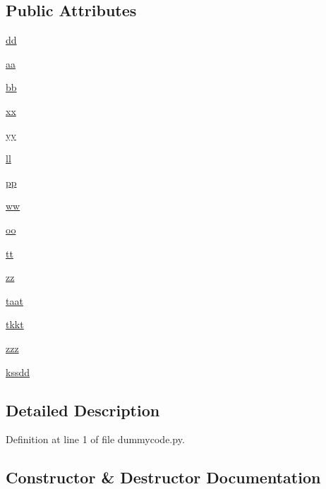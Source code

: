 \subsection*{Public Attributes}
\begin{DoxyCompactItemize}
\item 
\hyperlink{classdummycode_1_1dummy_af2feb69e325549343d505d0f5afaacd0}{dd}
\item 
\hyperlink{classdummycode_1_1dummy_ade8c2a23728fea407400de565af9d924}{aa}
\item 
\hyperlink{classdummycode_1_1dummy_a8fc4a473d7dc65b38abc8ca2bbf56d0c}{bb}
\item 
\hyperlink{classdummycode_1_1dummy_af1ae41fb24a1c0a52ae60bd1f2db9f5f}{xx}
\item 
\hyperlink{classdummycode_1_1dummy_ad0f056c4695b2525f883dbe1004fa7ba}{yy}
\item 
\hyperlink{classdummycode_1_1dummy_aff4159330a4c573597b401b5503818d7}{ll}
\item 
\hyperlink{classdummycode_1_1dummy_a4ded8e4fa38d817b96c7b21a869a16ae}{pp}
\item 
\hyperlink{classdummycode_1_1dummy_a65b1604eb43ffa41eb49a02655397fb7}{ww}
\item 
\hyperlink{classdummycode_1_1dummy_a49635a45286e102fb960d0bc4f4c3621}{oo}
\item 
\hyperlink{classdummycode_1_1dummy_ac1a6206c9bd102d051018258c3b54de9}{tt}
\item 
\hyperlink{classdummycode_1_1dummy_af5c829ccdb5a89e8ba0f2cf476cb2aa0}{zz}
\item 
\hyperlink{classdummycode_1_1dummy_a638ed861d153ec60095bed0527eb89fc}{taat}
\item 
\hyperlink{classdummycode_1_1dummy_ac97503870ca57fa0d663fcc8177e9f75}{tkkt}
\item 
\hyperlink{classdummycode_1_1dummy_a7557747db5bce912c99cd4f7505f57dd}{zzz}
\item 
\hyperlink{classdummycode_1_1dummy_ada8cd7476ddcf39248ec97cb1c7367e9}{kssdd}
\end{DoxyCompactItemize}


\subsection{Detailed Description}


Definition at line 1 of file dummycode.\-py.



\subsection{Constructor \& Destructor Documentation}
